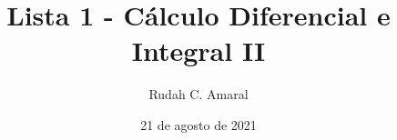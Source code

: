 \documentclass{article}
\author{Rudah C. Amaral}
\title{Lista 1 - Cálculo Diferencial e Integral II}
\date{21 de agosto de 2021}
\begin{document}
\maketitle
\clearpage
\tableofcontents
\label{TOC}
\clearpage
\end{document}

